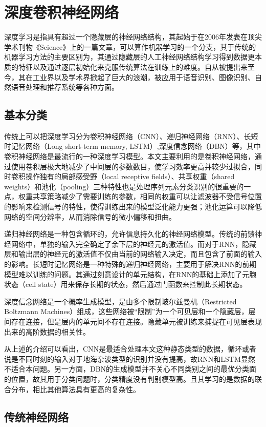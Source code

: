 \chapter{深度卷积神经网络}

深度学习是指具有超过一个隐藏层的神经网络结构，其起始于在2006年发表在顶尖学术刊物《Science》上的一篇文章，可以算作机器学习的一个分支，其于传统的机器学习方法的主要区别为，其通过隐藏层的人工神经网络结构学习得到数据更本质的特征以及通过逐层初始化来克服传统算法在训练上的难度。自从被提出来至今，其在工业界以及学术界掀起了巨大的浪潮，被应用于语音识别、图像识别、自然语音处理和推荐系统等各种方面。

\section{基本分类}
传统上可以把深度学习分为卷积神经网络（CNN）、递归神经网络（RNN）、长短时记忆网络（Long short-term memory, LSTM）,深度信念网络（DBN）等，其中卷积神经网络是最流行的一种深度学习模型。本文主要利用的是卷积神经网络，通过使用卷积层极大地减少了中间层的参数数目，使学习效率更高并较少过拟合，同时卷积操作独有的局部感受野（local receptive fields）、共享权重（shared weights）和池化（pooling）三种特性也是处理序列元素分类识别的很重要的一点，权重共享策略减少了需要训练的参数，相同的权重可以让滤波器不受信号位置的影响来检测信号的特性，使得训练出来的模型泛化能力更强；池化运算可以降低网络的空间分辨率，从而消除信号的微小偏移和扭曲。

递归神经网络是一种包含循环的，允许信息持久化的神经网络模型。传统的前馈神经网络中，单独的输入完全确定了余下层的神经元的激活值。而对于RNN，隐藏层和输出层的神经元的激活值不仅由当前的网络输入决定，而且包含了前面的输入的影响。长短时记忆网络是一种特殊的递归神经网络，主要用于解决RNN的前期模型难以训练的问题。其通过刻意设计的单元结构，在RNN的基础上添加了元胞状态（cell state）用来保存长期的状态，然后通过门函数来控制此长期状态。

深度信念网络是一个概率生成模型，是由多个限制玻尔兹曼机（Restricted Boltzmann Machines）组成，这些网络被“限制”为一个可见层和一个隐藏层，层间存在连接，但是层内的单元间不存在连接。隐藏单元被训练来捕捉在可见层表现出来的高阶数据的相关性。

从上述的介绍可以看出，CNN是最适合处理本文这种静态类型的数据，循环或者说是不同时刻的输入对于地海杂波类型的识别并没有提高，故RNN和LSTM显然不适合本问题。另一方面，DBN的生成模型并不关心不同类别之间的最优分类面的位置，故其用于分类问题时，分类精度没有判别模型高。且其学习的是数据的联合分布，相比其他算法具有更高的复杂性。

\section{传统神经网络}

